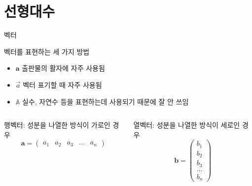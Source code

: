 \documentclass[10pt,t]{beamer}
\begin{document}
\section{선형대수}
\begin{frame}[fragile]{벡터}

    벡터를 표현하는 세 가지 방법
    \begin{itemize}
        \item $\mathbf{a}$ 출판물의 활자에 자주 사용됨
        \item $\vec{a}$ 벡터 표기할 때 자주 사용됨
        \item $\mathbb{A}$ 실수, 자연수 등을 표현하는데 사용되기 때문에 잘 안 쓰임
    \end{itemize}

    \let\oldhat\hat
    \renewcommand{\vec}[1]{\mathbf{#1}}
    \renewcommand{\hat}[1]{\oldhat{\mathbf{#1}}}

    \begin{columns}
        행벡터: 성분을 나열한 방식이 가로인 경우
\[\vec{a} = \begin{pmatrix}
    a_1 & a_2 & a_3 & \ldots & a_n 
\end{pmatrix}  \]

열벡터: 성분을 나열한 방식이 세로인 경우
\[\vec{b} = \begin{pmatrix}
b_1 \\ 
b_2 \\ 
b_3 \\ 
\ldots \\ 
b_n 
\end{pmatrix}  \]

\end{columns}
    
\end{frame}
\end{document}
